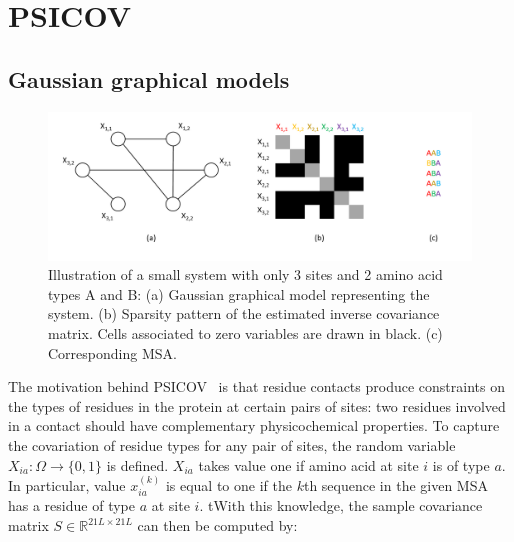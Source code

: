 \section{PSICOV}

    \subsection{Gaussian graphical models}

        \begin{figure}[H]
            \begin{center}
                \includegraphics[width=\textwidth, keepaspectratio]{imgs/ggm.png}
                \caption{Illustration of a small system with only 3 sites and 2 amino acid types A and B:
                    (a) Gaussian graphical model representing the system.
                    (b) Sparsity pattern of the estimated inverse covariance matrix.
                    Cells associated to zero variables are drawn in black. (c) Corresponding MSA.}
                \label{thresholds}
            \end{center}
        \end{figure}


        The motivation behind PSICOV~\cite{doi:10.1093/bioinformatics/btr638} is that residue contacts produce constraints on the types of residues in the
        protein at certain pairs of sites: two residues involved in a contact should have complementary physicochemical properties. To capture the covariation
        of residue types for any pair of sites, the random variable $X_{ia}: \Omega \rightarrow \{0, 1\}$ is defined. $X_{ia}$ takes value one if
        amino acid at site $i$ is of type $a$. In particular, value $x_{ia}^{(k)}$ is equal to one if the $k$th sequence in the given MSA has a residue of type $a$
        at site $i$. tWith this knowledge, the sample covariance matrix $S \in \mathbb{R}^{21 L \times 21 L}$ can then be computed by:

